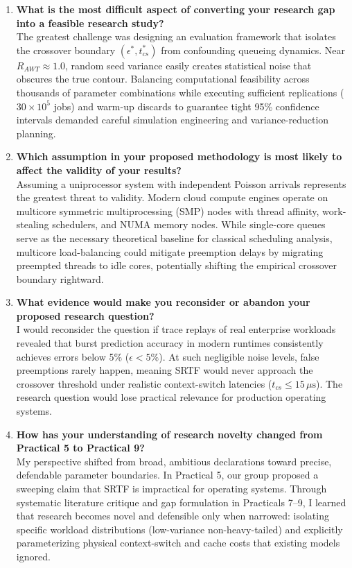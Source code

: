 \documentclass[11pt]{article}
\begin{document}
\begin{enumerate}[label=\textbf{\arabic*.}, leftmargin=1.4em, itemsep=0.6em, parsep=0pt]
    \item \textbf{What is the most difficult aspect of converting your research gap into a feasible research study?} \\
    The greatest challenge was designing an evaluation framework that isolates the crossover boundary $(\epsilon^*, t_{cs}^*)$ from confounding queueing dynamics. Near $R_{AWT} \approx 1.0$, random seed variance easily creates statistical noise that obscures the true contour. Balancing computational feasibility across thousands of parameter combinations while executing sufficient replications ($30 \times 10^5$ jobs) and warm-up discards to guarantee tight 95\% confidence intervals demanded careful simulation engineering and variance-reduction planning. 

    \item \textbf{Which assumption in your proposed methodology is most likely to affect the validity of your results?} \\
    Assuming a uniprocessor system with independent Poisson arrivals represents the greatest threat to validity. Modern cloud compute engines operate on multicore symmetric multiprocessing (SMP) nodes with thread affinity, work-stealing schedulers, and NUMA memory nodes. While single-core queues serve as the necessary theoretical baseline for classical scheduling analysis, multicore load-balancing could mitigate preemption delays by migrating preempted threads to idle cores, potentially shifting the empirical crossover boundary rightward.

    \item \textbf{What evidence would make you reconsider or abandon your proposed research question?} \\
    I would reconsider the question if trace replays of real enterprise workloads revealed that burst prediction accuracy in modern runtimes consistently achieves errors below 5\% ($\epsilon < 5\%$). At such negligible noise levels, false preemptions rarely happen, meaning SRTF would never approach the crossover threshold under realistic context-switch latencies ($t_{cs} \le 15\,\mu\text{s}$). The research question would lose practical relevance for production operating systems.

    \item \textbf{How has your understanding of research novelty changed from Practical 5 to Practical 9?} \\
    My perspective shifted from broad, ambitious declarations toward precise, defendable parameter boundaries. In Practical 5, our group proposed a sweeping claim that SRTF is impractical for operating systems. Through systematic literature critique and gap formulation in Practicals 7--9, I learned that research becomes novel and defensible only when narrowed: isolating specific workload distributions (low-variance non-heavy-tailed) and explicitly parameterizing physical context-switch and cache costs that existing models ignored.
\end{enumerate}
\end{document}
